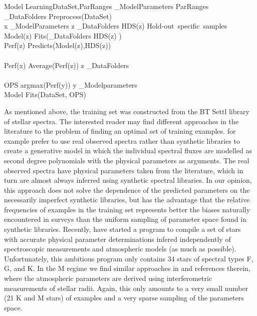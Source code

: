 \begin{pseudocode}[plain]{Model Learning}{DataSet,ParRanges}
\label{caretp}
 _{ModelParameters} \GETS ParRanges \\
 _{DataFolders} \GETS Preprocess(DataSet) \\ 
 \FOREACH x \in {}_{ModelParameters} \DO
  \BEGIN
    \FOREACH z \in {}_{DataFolders} \DO
      \BEGIN
	HDS(z) \GETS \mbox{Hold-out specific samples} \\
	Model(z) \GETS Fits(_{DataFolders} \setminus HDS(z) ) \\
	Perf(z) \GETS Predicts(Model(z),HDS(z)) \\
      \END \\
    Perf(x) \GETS Average(Perf(z)) \quad \forall z \in {}_{DataFolders} \\
  \END \\
  
  OPS \GETS argmax(Perf(y)) \quad \forall y \in {}_{Modelparameters} \\
  Model \GETS Fits(DataSet, OPS) \\
\end{pseudocode}

As mentioned above, the training set was constructed from the BT Settl
library of stellar spectra. The interested reader may find different
approaches in the literature to the problem of finding an optimal set
of training examples. \cite{hoggCannon} for example prefer to use real
observed spectra rather than synthetic libraries to create a
generative model in which the individual spectral fluxes are modelled
as second degree polynomials with the physical parameters as
arguments. The real observed spectra have physical parameters taken
from the literature, which in turn are almost always inferred using
synthetic spectral libraries. In our opinion, this approach does not
solve the dependence of the predicted parameters on the necessarily
imperfect synthetic libraries, but has the advantage that the relative
frequencies of examples in the training set represents better the
biases naturally encountered in surveys than the uniform sampling of
parameter space found in synthetic libraries. Recently, \cite{heiter}
have started a program to compile a set of stars with accurate
physical parameter determinations infered independently of
spectroscopic measurements and atmospheric models (as much as
possible). Unfortunately, this ambitious program only contains 34
stars of spectral types F, G, and K. In the M regime we find similar
approaches in \cite{2014AJ....147...47B} and references therein, where
the atmospheric parameters are derived using interferometric
measurements of stellar radii. Again, this only amounts to a very
small number (21 K and M stars) of examples and a very sparse sampling
of the parameters space.

